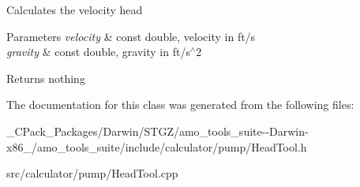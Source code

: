 Calculates the velocity head


\begin{DoxyParams}{Parameters}
{\em velocity} & const double, velocity in ft/s \\
\hline
{\em gravity} & const double, gravity in ft/s$^\wedge$2\\
\hline
\end{DoxyParams}
\begin{DoxyReturn}{Returns}
nothing 
\end{DoxyReturn}


The documentation for this class was generated from the following files\+:\begin{DoxyCompactItemize}
\item 
\+\_\+\+C\+Pack\+\_\+\+Packages/\+Darwin/\+S\+T\+G\+Z/amo\+\_\+tools\+\_\+suite-\/-\/\+Darwin-\/x86\+\_/amo\+\_\+tools\+\_\+suite/include/calculator/pump/Head\+Tool.\+h\item 
src/calculator/pump/Head\+Tool.\+cpp\end{DoxyCompactItemize}

